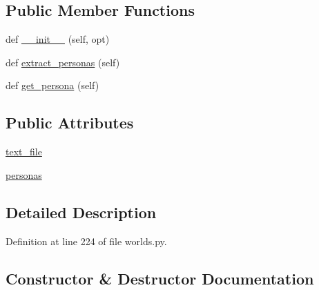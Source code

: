 \subsection*{Public Member Functions}
\begin{DoxyCompactItemize}
\item 
def \hyperlink{classprojects_1_1controllable__dialogue_1_1mturk_1_1worlds_1_1PersonasGenerator_a75f010d08625f01ab710857ffb490372}{\+\_\+\+\_\+init\+\_\+\+\_\+} (self, opt)
\item 
def \hyperlink{classprojects_1_1controllable__dialogue_1_1mturk_1_1worlds_1_1PersonasGenerator_aa850e152f50cbd96ea6899a830bdad10}{extract\+\_\+personas} (self)
\item 
def \hyperlink{classprojects_1_1controllable__dialogue_1_1mturk_1_1worlds_1_1PersonasGenerator_a788311f725f83f4f6da141df5241ca11}{get\+\_\+persona} (self)
\end{DoxyCompactItemize}
\subsection*{Public Attributes}
\begin{DoxyCompactItemize}
\item 
\hyperlink{classprojects_1_1controllable__dialogue_1_1mturk_1_1worlds_1_1PersonasGenerator_af1584a9c62e442bd5991c9332d809b9e}{text\+\_\+file}
\item 
\hyperlink{classprojects_1_1controllable__dialogue_1_1mturk_1_1worlds_1_1PersonasGenerator_a1ac9eda4d2584436eda2d19cccb4c70a}{personas}
\end{DoxyCompactItemize}


\subsection{Detailed Description}


Definition at line 224 of file worlds.\+py.



\subsection{Constructor \& Destructor Documentation}
\mbox{\label{classprojects_1_1controllable__dialogue_1_1mturk_1_1worlds_1_1PersonasGenerator_a75f010d08625f01ab710857ffb490372}} 

